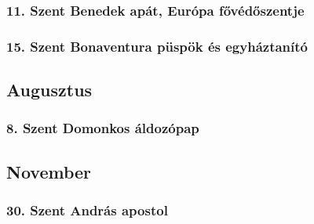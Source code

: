 \documentclass[twoside]{article}
\begin{document}
        \subsubsection*{11. Szent Benedek apát, Európa fővédőszentje}
            \begin{gregosheet}
            \end{gregosheet}
        \subsubsection*{15. Szent Bonaventura püspök és egyháztanító}
            \begin{gregosheet}
            \end{gregosheet}
    \subsection*{Augusztus}
        \subsubsection*{8. Szent Domonkos áldozópap}
            \begin{gregosheet}
            \end{gregosheet}
    \subsection*{November}
        \subsubsection*{30. Szent András apostol}
            \begin{gregosheet}
            \end{gregosheet}
\padtofour
\end{document}
